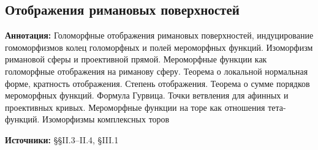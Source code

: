 \documentclass[a4paper, 12pt]{article}
\begin{document}
\subsection{Отображения римановых поверхностей}

{\bf Аннотация:} Голоморфные отображения римановых поверхностей, индуцирование гомоморфизмов колец голоморфных и полей мероморфных функций. Изоморфизм римановой сферы и проективной прямой. Мероморфные функции как голоморфные отображения на риманову сферу. Теорема о локальной нормальная форме, кратность отображения. Степень отображения. Теорема о сумме порядков мероморфных функций. Формула Гурвица. Точки ветвления для афинных и проективных кривых. Мероморфные функции на торе как отношения тета-функций. Изоморфизмы комплексных торов

{\bf Источники:} \cite{Mir} \S\S II.3--II.4, \S III.1
\end{document}
